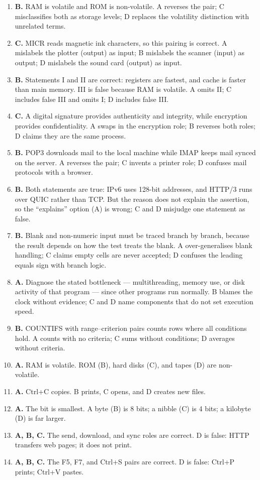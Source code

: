 \documentclass[11pt]{article}
\begin{document}
\begin{enumerate}[label=\textbf{Q\arabic*.}, leftmargin=*]
  that live in RAM. Holding recent data (A), being faster than RAM (B), and
  exploiting locality (D) are all true.
\item \textbf{B.} RAM is volatile and ROM is non-volatile. A reverses the
  pair; C misclassifies both as storage levels; D replaces the volatility
  distinction with unrelated terms.
\item \textbf{C.} MICR reads magnetic ink characters, so this pairing is
  correct. A mislabels the plotter (output) as input; B mislabels the
  scanner (input) as output; D mislabels the sound card (output) as input.
\item \textbf{B.} Statements I and II are correct: registers are fastest,
  and cache is faster than main memory. III is false because RAM is
  volatile. A omits II; C includes false III and omits I; D includes
  false III.
\item \textbf{C.} A digital signature provides authenticity and integrity,
  while encryption provides confidentiality. A swaps in the encryption role;
  B reverses both roles; D claims they are the same process.
\item \textbf{B.} POP3 downloads mail to the local machine while IMAP keeps
  mail synced on the server. A reverses the pair; C invents a printer role;
  D confuses mail protocols with a browser.
\item \textbf{B.} Both statements are true: IPv6 uses 128-bit addresses,
  and HTTP/3 runs over QUIC rather than TCP. But the reason does not explain
  the assertion, so the ``explains'' option (A) is wrong; C and D misjudge
  one statement as false.
\item \textbf{B.} Blank and non-numeric input must be traced branch by
  branch, because the result depends on how the test treats the blank. A
  over-generalises blank handling; C claims empty cells are never accepted;
  D confuses the leading equals sign with branch logic.
\item \textbf{A.} Diagnose the stated bottleneck --- multithreading, memory
  use, or disk activity of that program --- since other programs run
  normally. B blames the clock without evidence; C and D name components
  that do not set execution speed.
\item \textbf{B.} COUNTIFS with range--criterion pairs counts rows where
  all conditions hold. A counts with no criteria; C sums without
  conditions; D averages without criteria.

\item \textbf{A.} RAM is volatile. ROM (B), hard disks (C), and tapes (D) are non-volatile.
\item \textbf{A.} Ctrl+C copies. B prints, C opens, and D creates new files.
\item \textbf{A.} The bit is smallest. A byte (B) is 8 bits; a nibble (C) is 4 bits; a kilobyte (D) is far larger.
\item \textbf{A, B, C.} The send, download, and sync roles are correct. D is false: HTTP transfers web pages; it does not print.
\item \textbf{A, B, C.} The F5, F7, and Ctrl+S pairs are correct. D is false: Ctrl+P prints; Ctrl+V pastes.
\end{enumerate}
\def\JKSSBLessonID{58}\def\JKSSBAnswers{1}
\end{document}
